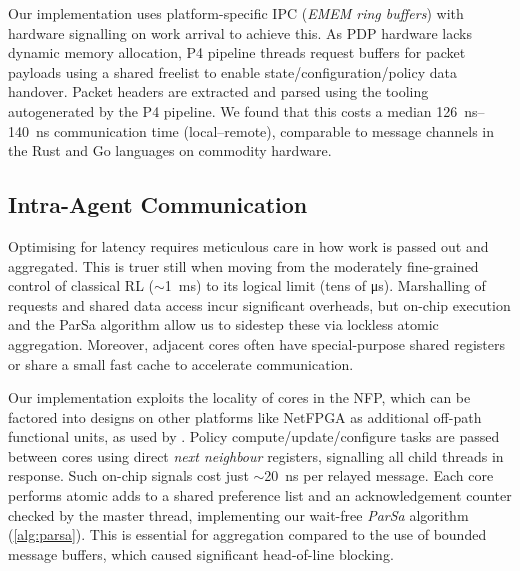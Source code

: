 \documentclass[
sigconf,natbib=false
,anonymous=true
,10pt
]{acmart}
\newcommand{\approachshort}{OPaL}
\begin{document}
Our implementation uses platform-specific IPC (\emph{EMEM ring buffers}) with hardware signalling on work arrival to achieve this.
As PDP hardware lacks dynamic memory allocation, P4 pipeline threads request buffers for packet payloads using a shared freelist to enable state/configuration/policy data handover.
Packet headers are extracted and parsed using the tooling autogenerated by the P4 pipeline.
We found that this costs a median \SIrange{126}{140}{\nano\second} communication time (local--remote), comparable to message channels in the Rust and Go languages on commodity hardware.


\subsection{Intra-Agent Communication}\label{sec:intra-agent-communication}
Optimising for latency requires meticulous care in how work is passed out and aggregated.
This is truer still when moving from the moderately fine-grained control of classical RL ($\sim$\SI{1}{\milli\second}) to its logical limit (tens of \si{\micro\second}).
Marshalling of requests and shared data access incur significant overheads, but on-chip execution and the ParSa algorithm allow us to sidestep these via lockless atomic aggregation.
Moreover, adjacent cores often have special-purpose shared registers or share a small fast cache to accelerate communication.


Our implementation exploits the locality of cores in the NFP, which can be factored into designs on other platforms like NetFPGA as additional off-path functional units, as used by \textcite{DBLP:conf/isca/LiLYCSH19}.
Policy compute/update/configure tasks are passed between cores using direct \emph{next neighbour} registers, signalling all child threads in response.
Such on-chip signals cost just $\sim$\SI{20}{\nano\second} per relayed message.
Each core performs atomic adds to a shared preference list and an acknowledgement counter checked by the master thread, implementing our wait-free \emph{ParSa} algorithm (\cref{alg:parsa}).
This is essential for aggregation compared to the use of bounded message buffers, which caused significant head-of-line blocking.
\end{document}
